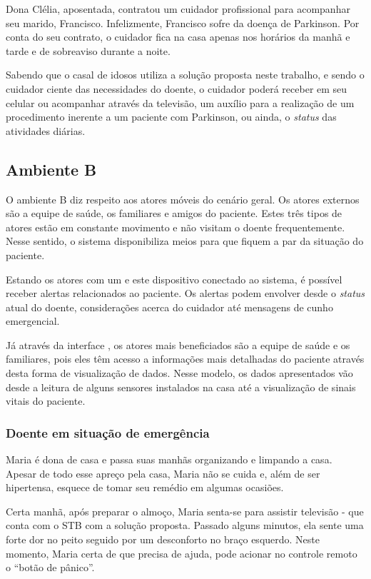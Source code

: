 Dona Clélia, aposentada, contratou um cuidador profissional para acompanhar seu
marido, Francisco. Infelizmente, Francisco sofre da doença de Parkinson. Por conta
do seu contrato, o cuidador fica na casa apenas nos horários da manhã e tarde e 
de sobreaviso durante a noite.

Sabendo que o casal de idosos utiliza a solução proposta neste trabalho, e sendo o
cuidador ciente das necessidades do doente, o cuidador poderá receber em seu celular ou
acompanhar através da televisão, um auxílio para a realização de um procedimento inerente
a um paciente com Parkinson, ou ainda, o \textit{status} das atividades diárias.

\subsection{Ambiente B} \label{subsec:ambiente-b}

O ambiente B diz respeito aos atores móveis do cenário geral. Os atores externos
são a equipe de saúde, os familiares e amigos do paciente. Estes três tipos de atores
estão em constante movimento e não visitam o doente frequentemente. Nesse
sentido, o sistema disponibiliza meios para que fiquem a par da situação do
paciente.

Estando os atores com um \smartphone[] e este dispositivo conectado ao
sistema, é possível receber alertas relacionados ao paciente. Os alertas podem
envolver desde o \textit{status} atual do doente, considerações acerca do
cuidador até mensagens de cunho emergencial.

Já através da interface \web[], os atores mais beneficiados são a equipe de
saúde e os familiares, pois eles têm acesso a informações mais detalhadas do
paciente através desta forma de visualização de dados. Nesse modelo, os dados
apresentados vão desde a leitura de alguns sensores instalados na casa até a
visualização de sinais vitais do paciente.

\subsubsection{Doente em situação de emergência}

Maria é dona de casa e passa suas manhãs organizando e limpando a casa. Apesar
de todo esse apreço pela casa, Maria não se cuida e, além de ser hipertensa,
esquece de tomar seu remédio em algumas ocasiões.

Certa manhã, após preparar o almoço, Maria senta-se para assistir televisão -
que conta com o STB com a solução proposta. Passado alguns minutos, ela sente
uma forte dor no peito seguido por um desconforto no braço esquerdo. Neste
momento, Maria certa de que precisa de ajuda, pode acionar no controle remoto o
``botão de pânico''. 

